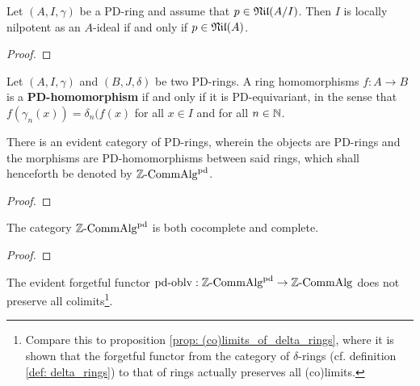             \begin{proposition} \label{prop: PD_structures_and_nilpotent_elements}
                Let $(A, I, \gamma)$ be a PD-ring and assume that $p \in \mathfrak{Nil}(A/I)$. Then $I$ is locally nilpotent as an $A$-ideal if and only if $p \in \mathfrak{Nil}(A)$.
            \end{proposition}
                \begin{proof}
                    
                \end{proof}
                
            \begin{definition}[PD-homomorphisms] \label{def: PD_homomorphisms}
                Let $(A, I, \gamma)$ and $(B, J, \delta)$ be two PD-rings. A ring homomorphisms $f: A \to B$ is a \textbf{PD-homomorphism} if and only if it is PD-equivariant, in the sense that $f(\gamma_n(x)) = \delta_n(f(x)$ for all $x \in I$ and for all $n \in \mathbb{N}$. 
            \end{definition}
            \begin{convention}
                There is an evident category of PD-rings, wherein the objects are PD-rings and the morphisms are PD-homomorphisms between said rings, which shall henceforth be denoted by $\mathbb{Z}\text{-}\mathrm{Comm}\mathrm{Alg}^{\mathrm{pd}}$.
            \end{convention}
            \begin{lemma} \label{prop: PD_structures_on_intersections_products_and_sums_of_ideals}
                
            \end{lemma}
                \begin{proof}
                    
                \end{proof}
            \begin{proposition} \label{prop: all_(co)limits_of_PD_rings_exist}
                The category $\mathbb{Z}\text{-}\mathrm{Comm}\mathrm{Alg}^{\mathrm{pd}}$ is both cocomplete and complete.
            \end{proposition}
                \begin{proof}
                    
                \end{proof}
            \begin{remark}
                The evident forgetful functor $\mathrm{pd}\text{-}\mathrm{oblv}: \mathbb{Z}\text{-}\mathrm{Comm}\mathrm{Alg}^{\mathrm{pd}} \to \mathbb{Z}\text{-}\mathrm{Comm}\mathrm{Alg}$ does not preserve all colimits\footnote{Compare this to proposition \ref{prop: (co)limits_of_delta_rings}, where it is shown that the forgetful functor from the category of $\delta$-rings (cf. definition \ref{def: delta_rings}) to that of rings actually preserves all (co)limits.}. 
            \end{remark}
        
